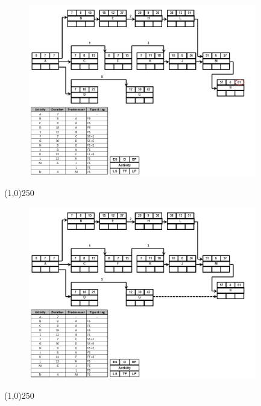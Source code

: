 \begin{frame}
\begin{figure}
	\centering
		\includegraphics[width = 10.0cm]{oldnotes/Slide218.jpg}
\end{figure}
\end{frame}
\begin{center}\line(1,0){250}\end{center}




\begin{frame}
\begin{figure}
	\centering
		\includegraphics[width = 10.0cm]{oldnotes/Slide219.jpg}
\end{figure}
\end{frame}
\begin{center}\line(1,0){250}\end{center}




